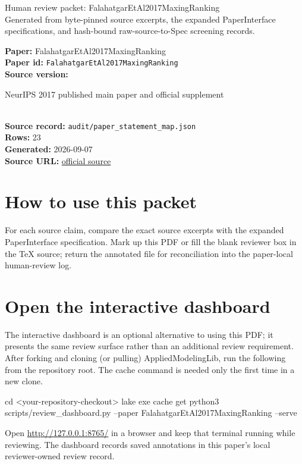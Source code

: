 \documentclass[10pt]{article}
\begin{document}
\fontsize{9}{10}\selectfont

\begin{center}
{\LARGE Human review packet: FalahatgarEtAl2017MaxingRanking}\\[0.35em]
\small Generated from byte-pinned source excerpts, the expanded PaperInterface
specifications, and hash-bound raw-source-to-Spec screening records.
\end{center}

\noindent\textbf{Paper:} FalahatgarEtAl2017MaxingRanking\\
\textbf{Paper id:} \texttt{FalahatgarEtAl2017MaxingRanking}\\
\textbf{Source version:} \parbox[t]{0.76\linewidth}{\raggedright NeurIPS 2017 published main paper and official supplement}\\
\textbf{Source record:} \texttt{audit/paper\_statement\_map.json}\\
\textbf{Rows:} 23\\
\textbf{Generated:} 2026-09-07\\
\textbf{Source URL:} \href{https://proceedings.neurips.cc/paper/2017/hash/db98dc0dbafde48e8f74c0de001d35e4-Abstract.html}{official source}





\section*{How to use this packet}
For each source claim, compare the exact source excerpts with the expanded
PaperInterface specification. Mark up this PDF or fill the blank reviewer box in the TeX source;
return the annotated file for reconciliation into the paper-local human-review
log.

\section*{Open the interactive dashboard}
The interactive dashboard is an optional alternative to using this PDF; it
presents the same review surface rather than an additional review requirement.
After forking and cloning (or pulling) AppliedModelingLib, run the following from the
repository root. The cache command is needed only the first time in a new clone.
\begin{ReviewVerbatim}
cd <your-repository-checkout>
lake exe cache get
python3 scripts/review_dashboard.py --paper FalahatgarEtAl2017MaxingRanking --serve
\end{ReviewVerbatim}
Open \url{http://127.0.0.1:8765/} in a browser and keep that terminal running
while reviewing. The dashboard records saved annotations in this paper's local
reviewer-owned review record.
\end{document}
